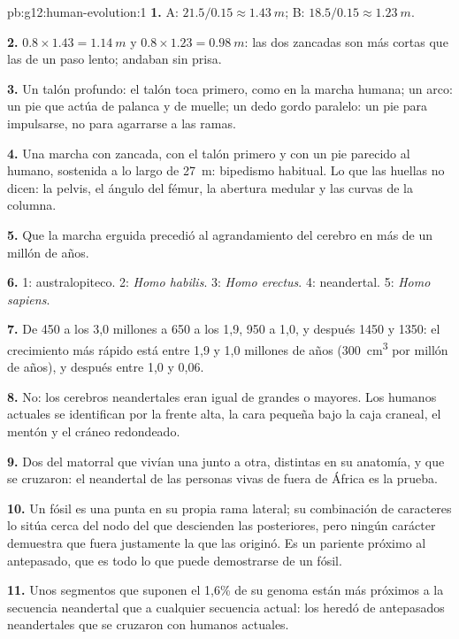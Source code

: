 \begin{solution}{pb:g12:human-evolution:1}
\textbf{1.} A: $21.5/0.15 \approx \qty{1.43}{m}$; B: $18.5/0.15
\approx \qty{1.23}{m}$.

\textbf{2.} $0.8 \times 1.43 = \qty{1.14}{m}$ y $0.8 \times 1.23 =
\qty{0.98}{m}$: las dos zancadas son más cortas que las de un paso
lento; andaban sin prisa.

\textbf{3.} Un talón profundo: el talón toca primero, como en la marcha
humana; un arco: un pie que actúa de palanca y de muelle; un dedo gordo
paralelo: un pie para impulsarse, no para agarrarse a las ramas.

\textbf{4.} Una marcha con zancada, con el talón primero y con un pie
parecido al humano, sostenida a lo largo de \qty{27}{m}: bipedismo
habitual. Lo que las huellas no dicen: la pelvis, el ángulo del fémur,
la abertura medular y las curvas de la columna.

\textbf{5.} Que la marcha erguida precedió al agrandamiento del cerebro
en más de un millón de años.

\textbf{6.} 1: australopiteco. 2: \emph{Homo habilis}. 3: \emph{Homo
erectus}. 4: neandertal. 5: \emph{Homo sapiens}.

\textbf{7.} De 450 a los 3,0 millones a 650 a los 1,9, 950 a 1,0, y
después 1450 y 1350: el crecimiento más rápido está entre 1,9 y 1,0
millones de años (\qty{300}{cm^3} por millón de años), y después entre
1,0 y 0,06.

\textbf{8.} No: los cerebros neandertales eran igual de grandes o
mayores. Los humanos actuales se identifican por la frente alta, la
cara pequeña bajo la caja craneal, el mentón y el cráneo redondeado.

\textbf{9.} Dos  del matorral que vivían una junto a otra,
distintas en su anatomía, y que se cruzaron: el  neandertal de las
personas vivas de fuera de África es la prueba.

\textbf{10.} Un fósil es una punta en su propia rama lateral; su
combinación de caracteres lo sitúa cerca del nodo del que descienden
las  posteriores, pero ningún carácter demuestra que fuera
justamente la  que las originó. Es un pariente próximo al
antepasado, que es todo lo que puede demostrarse de un fósil.

\textbf{11.} Unos segmentos que suponen el 1,6\% de su genoma están
más próximos a la secuencia neandertal que a cualquier secuencia
actual: los heredó de antepasados neandertales que se cruzaron con
humanos actuales.


\end{solution}
